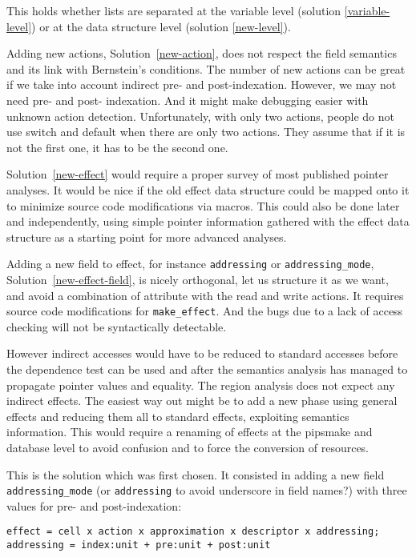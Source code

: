 \documentclass[a4paper]{report}
\begin{document}
This holds whether lists are separated at the variable level (solution
 \ref{variable-level}) or at the data structure level (solution
 \ref{new-level}).

Adding new actions, Solution~\ref{new-action}, does not respect the
 field semantics and its link with Bernstein's conditions. The number of
 new actions can be great if we take into account indirect pre- and
 post-indexation. However, we may not need pre- and post-
 indexation. And it might make debugging easier with unknown action
 detection. Unfortunately, with only two actions, people do not use
 switch and default when there are only two actions. They assume that
 if it is not the first one, it has to be the second one.

Solution~\ref{new-effect} would require a proper
 survey of most published pointer analyses. It would be nice if the
 old effect data structure could be mapped onto it to minimize source
 code modifications via macros. This could also be done later and
 independently, using simple pointer information gathered with the
 effect data structure as a starting point for more advanced analyses.


Adding a new field to effect, for instance \verb/addressing/ or
 \verb/addressing_mode/, Solution~\ref{new-effect-field}, is nicely
 orthogonal, let us structure it as we want, and avoid a combination
 of attribute with the read and write actions. It requires source code
 modifications for \verb/make_effect/. And the bugs due to a lack of
 access checking will not be syntactically detectable.

However indirect accesses would have to be reduced to standard
 accesses before the dependence test can be used and after the
 semantics analysis has managed to propagate pointer values and
 equality. The region analysis does not expect any indirect
 effects. The easiest way out might be to add a new phase using
 general effects and reducing them all to standard effects, exploiting
 semantics information. This would require a renaming of effects at
 the pipsmake and database level to avoid confusion and to force the
 conversion of resources.

This is the solution which was first chosen. It consisted in adding a new field
 \verb/addressing_mode/ (or \verb/addressing/ to avoid underscore in
 field names?) with three values for pre- and post-indexation:

\begin{verbatim}
effect = cell x action x approximation x descriptor x addressing;
addressing = index:unit + pre:unit + post:unit
\end{verbatim}
\end{document}
